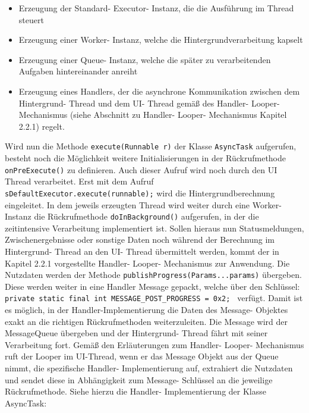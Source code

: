 \documentclass[12pt,oneside,a4paper,bibtotoc,liststotoc]{scrreprt}
\begin{document}
\begin{itemize}
\item Erzeugung der Standard- Executor- Instanz, die die Ausführung im Thread steuert
\item Erzeugung einer Worker- Instanz, welche die Hintergrundverarbeitung kapselt
\item Erzeugung einer Queue- Instanz, welche die später zu verarbeitenden Aufgaben hintereinander anreiht
\item Erzeugung eines Handlers, der die asynchrone Kommunikation zwischen dem Hintergrund- Thread und dem UI- Thread gemäß des Handler- Looper- Mechanismus (siehe Abschnitt zu Handler- Looper- Mechanismus Kapitel 2.2.1) regelt.
\end{itemize}
Wird nun die Methode \texttt{execute(Runnable r)} der Klasse \texttt{AsyncTask} aufgerufen, besteht noch die Möglichkeit weitere Initialisierungen in der Rückrufmethode \texttt{onPreExecute()} zu definieren. Auch dieser Aufruf wird noch durch den UI Thread verarbeitet. Erst mit dem Aufruf 
\texttt{sDefaultExecutor.execute(runnable);} wird die Hintergrundberechnung eingeleitet. In dem jeweils erzeugten Thread wird weiter durch eine Worker- Instanz die Rückrufmethode \texttt{doInBackground()} aufgerufen, in der die zeitintensive Verarbeitung implementiert ist. Sollen hieraus nun Statusmeldungen, Zwischenergebnisse oder sonstige Daten noch während der Berechnung im Hintergrund- Thread an den UI- Thread übermittelt werden, kommt der in Kapitel 2.2.1 vorgestellte Handler- Looper- Mechanismus zur Anwendung. Die Nutzdaten werden der Methode \texttt{publishProgress(Params...params)} übergeben. Diese werden weiter in eine Handler Message gepackt, welche über den Schlüssel: \newline
\texttt{\newline
private static final int MESSAGE\_POST\_PROGRESS = 0x2;\newline
}\newline
verfügt. Damit ist es möglich, in der Handler-Implementierung die Daten des Message- Objektes exakt an die richtigen Rückrufmethoden weiterzuleiten. Die Message wird der MessageQueue übergeben und der Hintergrund- Thread fährt mit seiner Verarbeitung fort. Gemäß den Erläuterungen zum Handler- Looper- Mechanismus ruft der Looper im UI-Thread, wenn er das Message Objekt aus der Queue nimmt, die spezifische Handler- Implementierung auf, extrahiert die Nutzdaten und sendet diese in Abhängigkeit zum Message- Schlüssel an die jeweilige Rückrufmethode. Siehe hierzu die Handler- Implementierung der Klasse AsyncTask:
\end{document}
